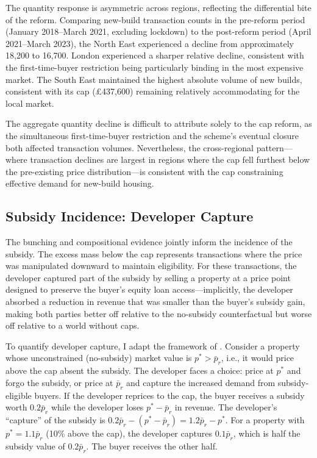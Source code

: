 \documentclass[12pt]{article}
\begin{document}
The quantity response is asymmetric across regions, reflecting the differential bite of the reform. Comparing new-build transaction counts in the pre-reform period (January 2018--March 2021, excluding lockdown) to the post-reform period (April 2021--March 2023), the North East experienced a decline from approximately 18,200 to 16,700. London experienced a sharper relative decline, consistent with the first-time-buyer restriction being particularly binding in the most expensive market. The South East maintained the highest absolute volume of new builds, consistent with its cap (\pounds437,600) remaining relatively accommodating for the local market.

The aggregate quantity decline is difficult to attribute solely to the cap reform, as the simultaneous first-time-buyer restriction and the scheme's eventual closure both affected transaction volumes. Nevertheless, the cross-regional pattern---where transaction declines are largest in regions where the cap fell furthest below the pre-existing price distribution---is consistent with the cap constraining effective demand for new-build housing.

\subsection{Subsidy Incidence: Developer Capture}

The bunching and compositional evidence jointly inform the incidence of the subsidy. The excess mass below the cap represents transactions where the price was manipulated downward to maintain eligibility. For these transactions, the developer captured part of the subsidy by selling a property at a price point designed to preserve the buyer's equity loan access---implicitly, the developer absorbed a reduction in revenue that was smaller than the buyer's subsidy gain, making both parties better off relative to the no-subsidy counterfactual but worse off relative to a world without caps.

To quantify developer capture, I adapt the framework of \citet{kleven2016bunching}. Consider a property whose unconstrained (no-subsidy) market value is $p^* > \bar{p}_r$, i.e., it would price above the cap absent the subsidy. The developer faces a choice: price at $p^*$ and forgo the subsidy, or price at $\bar{p}_r$ and capture the increased demand from subsidy-eligible buyers. If the developer reprices to the cap, the buyer receives a subsidy worth $0.2 \bar{p}_r$ while the developer loses $p^* - \bar{p}_r$ in revenue. The developer's ``capture'' of the subsidy is $0.2\bar{p}_r - (p^* - \bar{p}_r) = 1.2\bar{p}_r - p^*$. For a property with $p^* = 1.1\bar{p}_r$ (10\% above the cap), the developer captures $0.1\bar{p}_r$, which is half the subsidy value of $0.2\bar{p}_r$. The buyer receives the other half.
\end{document}
